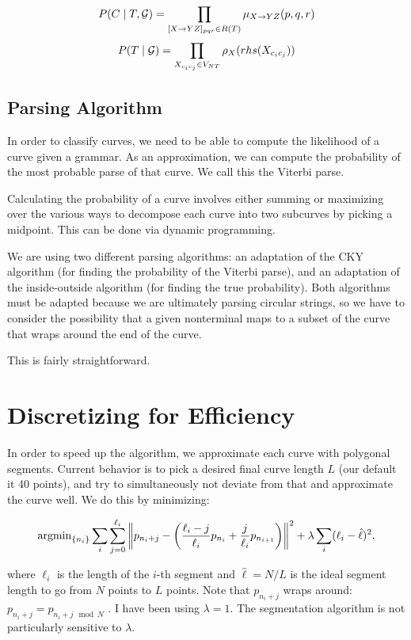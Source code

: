 \documentclass{article}
\begin{document}
$$P(C\mid T,{\mathcal G}) = \prod_{[X\to YZ]_{pqr}\in R(T)} \mu_{X\to YZ}(p,q,r)$$
$$P(T\mid {\mathcal G}) = \prod_{X_{c_i c_j}\in V_{NT}} \rho_{X}(rhs(X_{c_i c_j}))$$

\subsection{Parsing Algorithm}

In order to classify curves, we need to be able to compute the
likelihood of a curve given a grammar. As an approximation, we can
compute the probability of the most probable parse of that curve. We
call this the Viterbi parse.

Calculating the probability of a curve involves either summing or
maximizing over the various ways to decompose each curve into two
subcurves by picking a midpoint. This can be done via dynamic
programming.

We are using two different parsing algorithms: an adaptation of the
CKY algorithm (for finding the probability of the Viterbi parse), and
an adaptation of the inside-outside algorithm (for finding the true
probability). Both algorithms must be adapted because we are
ultimately parsing circular strings, so we have to consider the
possibility that a given nonterminal maps to a subset of the curve
that wraps around the end of the curve.

This is fairly straightforward.


\section{Discretizing for Efficiency}

In order to speed up the algorithm, we approximate each curve with
polygonal segments.  Current behavior is to pick a desired final curve
length $L$ (our default it 40 points), and try to simultaneously not
deviate from that and approximate the curve well. We do this by
minimizing:

$$\operatorname{argmin}_{ \{n_i \} } \sum_i \sum_{j=0}^{\ell_i} \left\| p_{n_i+j} -
\left( \frac{\ell_i - j}{\ell_i} p_{n_i} + \frac{j}{\ell_i}
p_{n_{i+1}} \right) \right\|^2 + \lambda \sum_i (\ell_i -
\hat{\ell})^2,$$
  
where $\ell_i$ is the length of the $i$-th segment and $\hat{\ell} =
N/L$ is the ideal segment length to go from $N$ points to $L$
points. Note that $p_{n_i + j}$ wraps around: $p_{n_i + j} = p_{n_i+j
  \mod N}$ . I have been using $\lambda=1$. The segmentation algorithm
is not particularly sensitive to $\lambda$.
\end{document}
